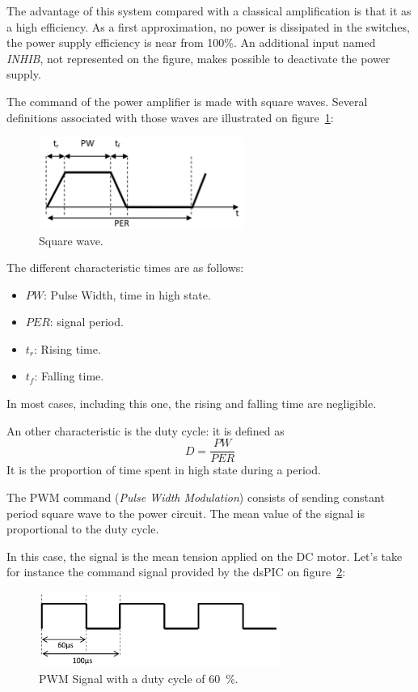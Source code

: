 \documentclass[11pt,a4paper]{article}
\theoremstyle{definition}%
\begin{document}
The advantage of this system compared with a classical amplification is that it as a high efficiency.
As a first approximation, no power is dissipated in the switches, the power supply efficiency is near from 100\%.
An additional input named \textit{INHIB}, not represented on the figure, makes possible to deactivate the power supply.

The command of the power amplifier is made with square waves.
Several definitions associated with those waves are illustrated on figure~\ref{fig:square-wave}:
\begin{figure}[H]
\center
\includegraphics[width=0.6\textwidth]{square-wave}
\caption{Square wave.}
\label{fig:square-wave}
\end{figure}

The different characteristic times are as follows:
\begin{itemize}
	\item $PW$: Pulse Width, time in high state.
	\item $PER$: signal period.
	\item $t_r$: Rising time.
	\item $t_f$: Falling time.
\end{itemize}

In most cases, including this one, the rising and falling time are negligible.

An other characteristic is the duty cycle: it is defined as \[D = \frac{PW}{PER}\]
It is the proportion of time spent in high state during a period.

The PWM command (\textit{Pulse Width Modulation}) consists of sending constant period square wave to the power circuit.
The mean value of the signal is proportional to the duty cycle.

In this case, the signal is the mean tension applied on the DC motor.
Let's take for instance the command signal provided by the dsPIC on figure~\ref{fig:pwm}:
\begin{figure}[H]
\center
\includegraphics[width=0.7\textwidth]{pwm}
\caption{PWM Signal with a duty cycle of 60~\%.}
\label{fig:pwm}
\end{figure}
\end{document}
